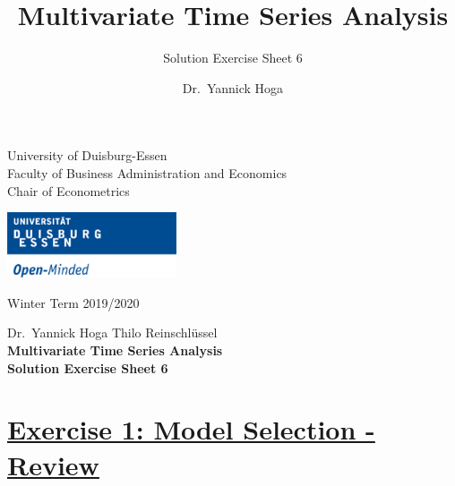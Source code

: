 \documentclass[12pt,a4paper]{article}
\title{Multivariate Time Series Analysis}
\subtitle{Solution Exercise Sheet 6}
\author{Dr.~Yannick Hoga}
\date{}
\newcommand{\tmpsection}[1]{}
\let\tmpsection=\section
\renewcommand{\section}[1]{\tmpsection{\underline{#1}} }
\begin{document}





\restoregeometry



\begin{minipage}{0.6\textwidth}
University of Duisburg-Essen\\
Faculty of Business Administration and Economics\\
Chair of Econometrics\\
\end{minipage}

	\begin{flushright}
	\vspace{-3cm}
	\includegraphics*[width=5cm]{../Includes/duelogo_en.png}\\
	\vspace{.125cm}
	\end{flushright}
\hspace{-0.005cm}Winter Term 2019/2020

\vspace{0.05cm}

\begin{center}
	\vspace{.25cm}
	Dr.~Yannick Hoga \hspace{.5cm} Thilo Reinschlüssel \\
	\vspace{.25cm}
	\textbf{\Large{Multivariate Time Series Analysis}}\\
	\vspace{.25cm}
	\textbf{\large{Solution Exercise Sheet 6}}\\
	\vspace{.125cm}
\end{center}





\hypertarget{exercise-1-model-selection---review}{%
\section{Exercise 1: Model Selection -
Review}\label{exercise-1-model-selection---review}}
\end{document}
